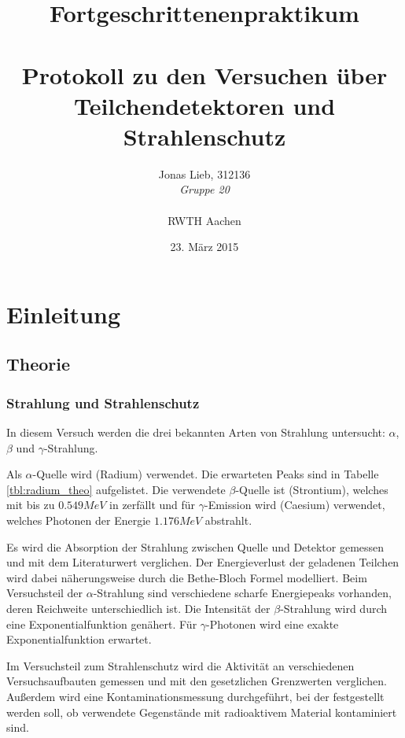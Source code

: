 \documentclass{../Misc/MontavonLaTeX/Montavon}
\date{23. März 2015}
\begin{document}
\title{Fortgeschrittenenpraktikum \\ \quad \\ Protokoll zu den Versuchen über Teilchendetektoren und Strahlenschutz}
\author{Jonas Lieb, 312136 \\ \emph{Gruppe 20} \\ \\  RWTH Aachen}
\maketitle

\newpage

\setcounter{tocdepth}{2}
\tableofcontents
\newpage

\section{Einleitung}
\subsection{Theorie}
\subsubsection{Strahlung und Strahlenschutz}
In diesem Versuch werden die drei bekannten Arten von Strahlung untersucht: $\alpha$, $\beta$ und $\gamma$-Strahlung. 

Als $\alpha$-Quelle wird  (Radium) verwendet. Die erwarteten Peaks sind in Tabelle \ref{tbl:radium_theo} aufgelistet. Die verwendete $\beta$-Quelle ist  (Strontium), welches mit bis zu $0.549 \unit{MeV}$ in  zerfällt und für $\gamma$-Emission wird  (Caesium) verwendet, welches Photonen der Energie $1.176 \unit{MeV}$ abstrahlt.

Es wird die Absorption der Strahlung zwischen Quelle und Detektor gemessen und mit dem Literaturwert verglichen. Der Energieverlust der geladenen Teilchen wird dabei näherungsweise durch die Bethe-Bloch Formel modelliert. Beim Versuchsteil der $\alpha$-Strahlung sind verschiedene scharfe Energiepeaks vorhanden, deren Reichweite unterschiedlich ist. Die Intensität der $\beta$-Strahlung wird durch eine Exponentialfunktion genähert. Für $\gamma$-Photonen wird eine exakte Exponentialfunktion erwartet.

Im Versuchsteil zum Strahlenschutz wird die Aktivität an verschiedenen Versuchsaufbauten gemessen und mit den gesetzlichen Grenzwerten verglichen. Außerdem wird eine Kontaminationsmessung durchgeführt, bei der festgestellt werden soll, ob verwendete Gegenstände mit radioaktivem Material kontaminiert sind.
\end{document}
